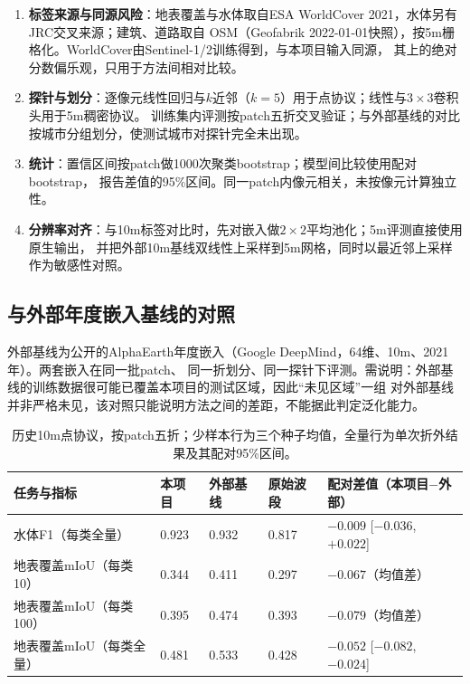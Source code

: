 \documentclass[UTF8,fontset=fandol,zihao=5,a4paper]{ctexart}
\begin{document}
\begin{enumerate}
\item \textbf{标签来源与同源风险}：地表覆盖与水体取自ESA WorldCover 2021，水体另有JRC交叉来源；建筑、道路取自
OSM（Geofabrik 2022-01-01快照），按5m栅格化。WorldCover由Sentinel-1/2训练得到，与本项目输入同源，
其上的绝对分数偏乐观，只用于方法间相对比较。
\item \textbf{探针与划分}：逐像元线性回归与$k$近邻（$k=5$）用于点协议；线性与$3\times3$卷积头用于5m稠密协议。
训练集内评测按patch五折交叉验证；与外部基线的对比按城市分组划分，使测试城市对探针完全未出现。
\item \textbf{统计}：置信区间按patch做1000次聚类bootstrap；模型间比较使用配对bootstrap，
报告差值的95\%区间。同一patch内像元相关，未按像元计算独立性。
\item \textbf{分辨率对齐}：与10m标签对比时，先对嵌入做$2\times2$平均池化；5m评测直接使用原生输出，
并把外部10m基线双线性上采样到5m网格，同时以最近邻上采样作为敏感性对照。
\end{enumerate}

\subsection{与外部年度嵌入基线的对照}
外部基线为公开的AlphaEarth年度嵌入（Google DeepMind，64维、10m、2021年）。两套嵌入在同一批patch、
同一折划分、同一探针下评测。需说明：外部基线的训练数据很可能已覆盖本项目的测试区域，因此“未见区域”一组
对外部基线并非严格未见，该对照只能说明方法之间的差距，不能据此判定泛化能力。

\begin{table}[h]
\caption{历史10m点协议，按patch五折；少样本行为三个种子均值，全量行为单次折外结果及其配对95\%区间。}
\centering\small
\begin{tabularx}{\linewidth}{@{}p{2.6cm}YYYY@{}}
\toprule 任务与指标 & 本项目 & 外部基线 & 原始波段 & 配对差值（本项目$-$外部）\\\midrule
水体F1（每类全量） & 0.923 & 0.932 & 0.817 & $-0.009$ [$-0.036$, $+0.022$]\\
地表覆盖mIoU（每类10） & 0.344 & 0.411 & 0.297 & $-0.067$（均值差）\\
地表覆盖mIoU（每类100） & 0.395 & 0.474 & 0.393 & $-0.079$（均值差）\\
地表覆盖mIoU（每类全量） & 0.481 & 0.533 & 0.428 & $-0.052$ [$-0.082$, $-0.024$]\\\bottomrule
\end{tabularx}
\end{table}
\end{document}
